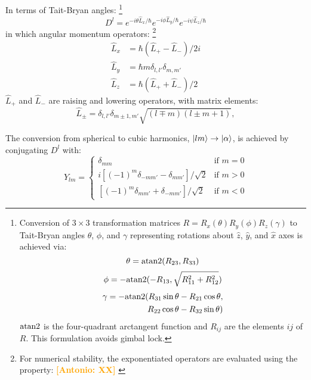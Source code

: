 \documentclass[twocolumn,showpacs,preprintnumbers,superscriptaddress,prb,floatfix,aps,10pt]{revtex4-1}
\newcommand{\abmei}[1]{\textcolor{orange}{ \bf [Antonio: #1] }}
\newcommand*{\wignerDl}{D^{l}}%
\newcommand*{\x}{\times}
\begin{document}
In terms of Tait-Bryan angles:
%
\footnote{
Conversion of $3\x3$ transformation matrices $R = R_x(\theta)R_y(\phi)R_z(\gamma)$ to Tait-Bryan angles $\theta$, $\phi$, and $\gamma$ representing rotations about $\hat{z}$, $\hat{y}$, and $\hat{x}$ axes is achieved via:
\begin{equation}
\theta = {\rm atan2}(R_{23},R_{33})
\end{equation}
\begin{equation}
\phi   =-{\rm atan2}(-R_{13},\sqrt{R_{11}^2+R_{12}^2})
\end{equation}
\begin{equation}
\begin{split}
\gamma =-{\rm atan2}(R_{31}\sin{\theta}-R_{21}\cos{\theta}, \\ 
       \quad         R_{22}\cos{\theta}-R_{32}\sin{\theta})
\end{split}
\end{equation}
${\rm atan2}$ is the four-quadrant arctangent function and $R_{ij}$ are the elements $ij$ of $R$. This formulation avoids gimbal lock.} 
%
\begin{equation}
\wignerDl = e^{-i\theta\hat{L}_x/\hbar} e^{-i\phi\hat{L}_y/\hbar} e^{-i\psi\hat{L}_z/\hbar}
\end{equation}
%
in which angular momentum operators:
%
\footnote{For numerical stability, the exponentiated operators are evaluated using the property: \abmei{XX} } \cite{shankar_fundamentals_2014}
%
\begin{align}
\label{eq:angular_momenta}
\hat{L}_x & = \hbar (\hat{L}_{+}-\hat{L}_{-})/2i \\
\hat{L}_y & = \hbar m \delta_{l,l'}\delta_{m,m'} \\
\hat{L}_z & = \hbar (\hat{L}_{+}+\hat{L}_{-})/2
\end{align}
$\hat{L}_+$ and $\hat{L}_-$ are raising and lowering operators, with matrix elements:
\begin{equation}
\label{eq:raising_lowering_operator}
\hat{L}_{\pm} = \delta_{l,l'}\delta_{m\pm1,m'} \sqrt{(l\mp m)(l\pm m+1)},
\end{equation}









The conversion from spherical to cubic harmonics, $\ket{lm} \rightarrow \ket{\alpha}$, is achieved by conjugating $\wignerDl$ with:
\begin{equation}
\label{eq:cubic_harmonics}
Y_{lm} = 
\begin{cases}
\delta_{mm}                                      & \text{if } m = 0 \\
 i[(-1)^{m}\delta_{-mm'}-\delta_{ mm'}]/\sqrt{2} & \text{if } m > 0 \\
  [(-1)^{m}\delta_{ mm'}+\delta_{-mm'}]/\sqrt{2} & \text{if } m < 0
\end{cases}
\end{equation}
\end{document}
